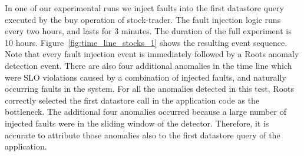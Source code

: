 In one of our experimental runs we inject faults into the first datastore query executed by the buy operation
of stock-trader. The fault injection logic runs every two hours, and lasts for 3 minutes. The duration of
the full experiment is 10 hours. 
Figure~\ref{fig:time_line_stocks_1} shows the resulting event sequence. Note that every fault injection
event is immediately followed by a Roots anomaly detection event. There are also four additional
anomalies in the time line which were SLO violations caused by a combination of injected faults, and
naturally occurring faults in the system. For all the anomalies detected
in this test, Roots correctly selected the first datastore call in the application code as the bottleneck. 
The additional four anomalies occurred because a large number of injected faults were in the sliding window
of the detector. Therefore, it is accurate to attribute those anomalies also to the first datastore query
of the application.




